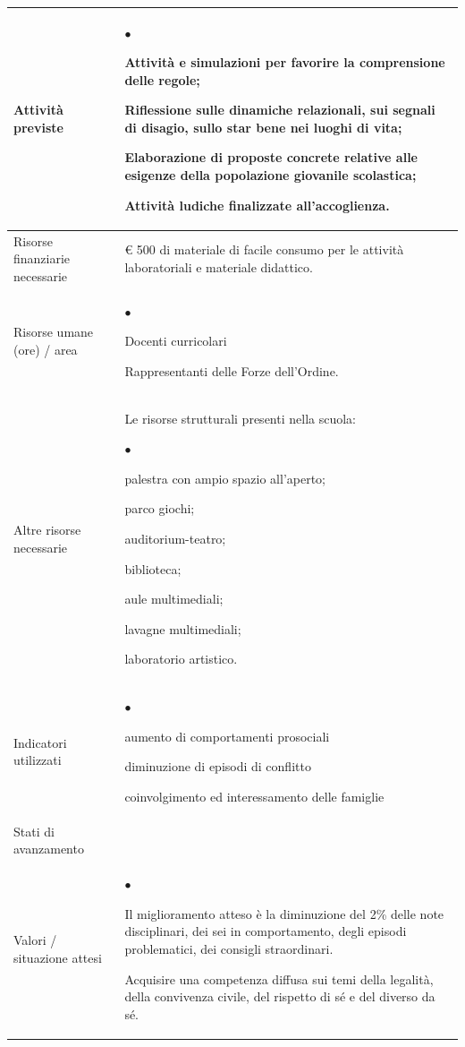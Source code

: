 \documentclass[12pt,a4paper,oneside]{memoir}
\newenvironment{elenco}{\begin{list}{$\bullet$}{%
              \setlength{\leftmargin}{4mm}%
              \setlength{\rightmargin}{1mm}%
               \setlength{\itemindent}{0mm}%
               \setlength{\labelwidth}{2mm}%
               \setlength{\labelsep}{2mm}%
              \setlength{\itemsep}{-\parsep}%
              \setlength{\partopsep}{0pt}%
              \setlength{\topsep}{0pt}%
             \setlength{\parskip}{0pt}%
              }}{\end{list}}
\begin{document}
\begin{footnotesize}
\begin{longtable}{|>{\raggedright}p{2.5cm}|>{\raggedright\arraybackslash}P{10cm}|}
Attività previste&
\begin{elenco}
\item Attività e simulazioni per favorire la comprensione delle regole;
\item Riflessione sulle dinamiche relazionali, sui segnali di disagio, sullo star bene nei luoghi di vita;
\item Elaborazione di proposte concrete relative alle esigenze della popolazione giovanile scolastica;
\item Attività ludiche finalizzate all'accoglienza.
\end{elenco}\\[-4mm] \hline
Risorse finanziarie necessarie&€ 500 di materiale di facile consumo per le attività laboratoriali e materiale didattico.\\ \hline
Risorse umane (ore) / area&
\begin{elenco}
\item Docenti curricolari 
\item Rappresentanti delle Forze dell'Ordine.
\end{elenco}\\[-4mm] \hline
Altre risorse necessarie&Le risorse strutturali presenti nella scuola:
\begin{elenco}
\item palestra con ampio spazio all'aperto;
\item parco giochi;
\item auditorium-teatro;
\item biblioteca;
\item aule multimediali;
\item lavagne multimediali;
\item laboratorio artistico.
\end{elenco}\\ \hline
Indicatori utilizzati&
\begin{elenco}
\item aumento di comportamenti prosociali
\item diminuzione di episodi di conflitto
\item coinvolgimento ed interessamento delle famiglie
\end{elenco}\\[-4mm] \hline
Stati di avanzamento&\\ \hline
Valori / situazione attesi&
\begin{elenco}
\item Il miglioramento atteso è la diminuzione del 2\% delle note disciplinari, dei sei in comportamento, degli episodi problematici, dei consigli straordinari. 
\item Acquisire una competenza diffusa sui temi della legalità, della convivenza civile, del rispetto di sé e del diverso da sé.\end{elenco}\\ \hline
\end{longtable}
\end{footnotesize}
\end{document}
